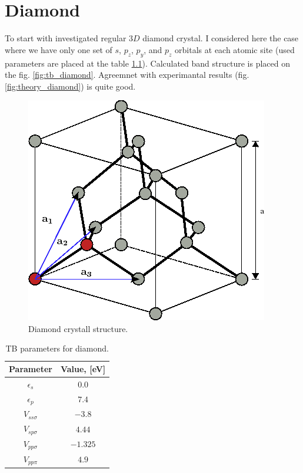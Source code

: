 \chapter{Diamond}
To start with investigated regular $3D$ diamond crystal. I considered here the case where we have only one set of $s$, $p_z$, $p_y$, and $p_z$ orbitals at each
atomic site (used parameters are placed at the table \ref{tab:diamond_params}). Calculated band structure is placed on the fig. \ref{fig:tb_diamond}. Agreemnet with experimantal results (fig. \ref{fig:theory_diamond}) is quite good.
\begin{figure}[h] 
 \begin{center}
  \includegraphics[width=0.3\linewidth]{img/diamond_crystall}
  \caption{Diamond crystall structure.}
 \end{center}
\end{figure}

\begin{table}[h]
 \begin{center}
  \begin{tabular}{|c|c|}
  \hline
    Parameter&Value, [eV]\\ \hline
    $\epsilon_s$ & $0.0$ \\ \hline
    $\epsilon_p$ & $7.4$ \\ \hline
    $V_{ss \sigma}$ & $-3.8$  \\ \hline
    $V_{sp \sigma}$ & $4.44$\\ \hline
    $V_{pp \sigma}$ & $-1.325$ \\ \hline
    $V_{pp \pi}$ &  $4.9$\\ \hline
  \end{tabular}
 \end{center}
  \caption{TB parameters for diamond. \label{tab:diamond_params}}
\end{table}

